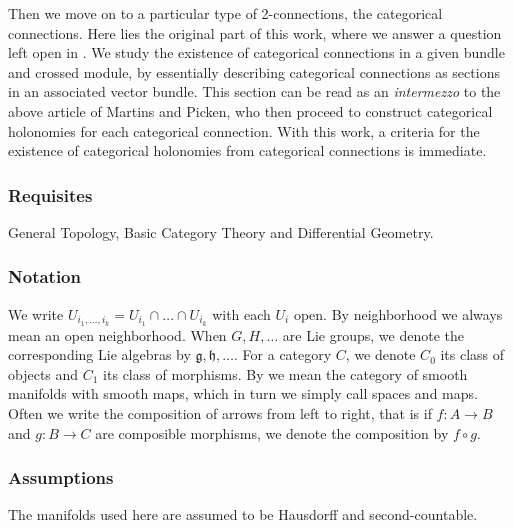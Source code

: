 Then we move on to a particular type of 2-connections, the categorical connections. Here lies the original part of this work, where we answer a question left open in \cite{picken_faria}. We study the existence of categorical connections in a given bundle and crossed module, by essentially describing categorical connections as sections in an associated vector bundle. 
This section can be read as an \emph{intermezzo} to the above article of Martins and Picken, who then proceed to construct categorical holonomies for each categorical connection. With this work, a criteria for the existence of categorical holonomies from categorical connections is immediate.
% 
% 

\subsubsection*{Requisites} General Topology, Basic Category Theory and Differential Geometry.

\subsubsection*{Notation} We write $U_{i_1,\ldots,i_k}= U_{i_1}\cap\ldots \cap U_{i_k}$ with each $U_i$ open. By neighborhood we always mean an open neighborhood. When $G, H, \ldots$ are Lie groups, we denote the corresponding Lie algebras by $\mathfrak{g},\mathfrak{h}, \ldots$. For a category $C$, we denote $C_0$ its class of objects and $C_1$ its class of morphisms. By  we mean the category of smooth manifolds with smooth maps, which in turn we simply call spaces and maps. Often we write the composition of arrows from left to right, that is if $f:A\rightarrow B$ and $g:B\rightarrow C$ are composible morphisms, we denote the composition by $f\circ g$.

\subsubsection*{Assumptions}

The manifolds used here are assumed to be Hausdorff and second-countable.


